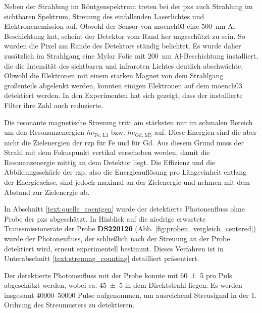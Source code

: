 \noindent
Neben der Strahlung im Röntgenspektrum treten bei der \gls{pxs} auch Strahlung im sichtbaren Spektrum, Streuung des einfallenden Laserlichtes und Elektronenemission auf. Obwohl der Sensor von \gls{moench03} eine \SI{500}{\nano\meter} Al-Beschichtung hat, scheint der Detektor vom Rand her ungeschützt zu sein. So wurden die Pixel am Rande des Detektors ständig belichtet. Es wurde daher zusätzlich im Strahlgang eine Mylar Folie mit \SI{200}{\nano\meter} Al-Beschichtung installiert, die die Intensität des sichtbaren und infraroten Lichtes deutlich abschwächte. Obwohl die Elektronen mit einem starken Magnet von dem Strahlgang großenteils abgelenkt werden, konnten einigen Elektronen auf dem \gls{moench03} detektiert werden. In den Experimenten hat sich gezeigt, dass der installierte Filter ihre Zahl auch reduzierte.
%

\noindent
Die resonante magnetische Streuung tritt am stärksten nur im schmalen Bereich um den Resonanzenergien $h\nu_{\text{Fe, L3}}$ bzw. $h\nu_{\text{Gd, M5}}$ auf. Diese Energien sind die aber nicht die Zielenergien der \gls{rzp} für Fe und für Gd. Aus diesem Grund muss der Strahl mit dem Fokuspunkt vertikal verschoben werden, damit die Resonanzenergie mittig an dem Detektor liegt. Die Effizienz und die Abbildungsschärfe der \gls{rzp}, also die Energieauflösung pro Längeeinheit entlang der Energieachse, sind jedoch maximal an der Zielenergie und nehmen mit dem Abstand zur Zielenergie ab.

\noindent
In Abschnitt \ref{text:quelle_roentgen} wurde der detektierte Photonenfluss ohne Probe der \gls{pxs} abgeschätzt. In Hinblick auf die niedrige erwartete Transsmissionsrate der Probe \textbf{DS220126} (Abb. \ref{fig:proben_vergleich_centered}) wurde der Photonenfluss, der schließlich nach der Streuung an der Probe detektiert wird, erneut experimentell bestimmt. Dieses Verfahren ist in Unterabschnitt \ref{text:streuung_counting} detailliert präsentiert.

\noindent
Der detektierte Photonenfluss mit der Probe konnte mit \SI{60(5)}{\photons} pro Puls abgeschätzt werden, wobei ca. \SI{45(5)}{\photons} in dem Direktstrahl liegen. Es werden insgesamt \numrange{40000}{50000} Pulse aufgenommen, um ausreichend Streusignal in der 1. Ordnung des Streumusters zu detektieren.